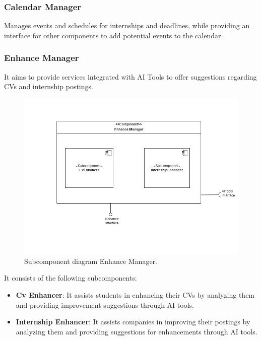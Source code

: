 \subsubsection{Calendar Manager} Manages events and schedules for internships and deadlines, while providing an interface for other components to add potential events to the calendar.

 
\subsubsection{Enhance Manager} It aims to provide services integrated with AI Tools to offer suggestions regarding CVs and internship postings.
 \begin{figure}[htbp]
    \centering
    \includegraphics[width=\linewidth]{DD/Images/Comp&Sub/EnhanceManager.png}
    \caption{Subcomponent diagram Enhance Manager.}
    \label{fig:enhance_manager}
    \end{figure}

It consists of the following subcomponents:
\begin{itemize}
    \item  \textbf{Cv Enhancer}: It assists students in enhancing their CVs by analyzing them and providing improvement suggestions through AI tools.
    \item  \textbf{Internship Enhancer}: It assists companies in improving their postings by analyzing them and providing suggestions for enhancements through AI tools.
    \end{itemize}
    


